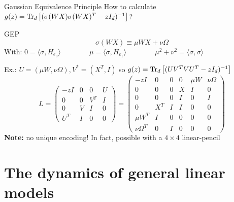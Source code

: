 \documentclass[10pt]{beamer}
\begin{document}
\begin{frame}{Gaussian Equivalence Principle}
  How to calculate $g(z) = \traceLim[d]{(\sigma(WX) \sigma(WX)^T - zI_d)^{-1}}$?
  \begin{block}{GEP \cite{pennington2017nonlinear}}
    \begin{equation}
      \sigma(WX) \equiv
      \mu W X + \nu \Omega
    \end{equation}
    With:
    $
      0 = \langle \sigma, H_{e_0} \rangle
      \qquad
      \qquad
      \mu = \langle \sigma, H_{e_1} \rangle
      \qquad
      \qquad
      \mu^2 + \nu^2 = \langle \sigma, \sigma \rangle
    $
  \end{block}
  Ex.: $U = (\mu W, \nu \Omega), V^* = (X^T, I)$ so $g(z) = \traceLim[d]{(U V^T V U^T - zI_d)^{-1}}$
  \begin{equation*}
    L = \begin{pmatrix}
      -z I & 0 & 0 & U\\
      0 & 0 & V^T & I\\
      0 & V & I & 0\\
      U^T & I & 0 & 0
    \end{pmatrix}
    = \begin{pmatrix}
      -z I & 0 & 0 & 0 & \mu W & \nu \Omega\\
      0  & 0 & 0 & X & I & 0\\
      0  & 0 & 0& I & 0 & I\\
      0 & X^T & I & I & 0 & 0\\
      \mu W^T  & I & 0 & 0 & 0 & 0\\
      \nu \Omega^T & 0 & I & 0 & 0 & 0
    \end{pmatrix}
  \end{equation*}
  \textbf{Note:} no unique encoding! In fact, possible with a $4\times 4$ linear-pencil
\end{frame}

\section{The dynamics of general linear models}
\end{document}
